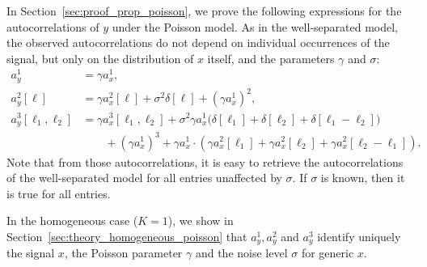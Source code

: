 \documentclass[12pt]{article}
\newcommand{\1}{\mathbf{1}}
\newcommand{\TODO}[1]{{\color{red}{[#1]}}}
\theoremstyle{plain}
\theoremstyle{definition}
\theoremstyle{remark}
\theoremstyle{plain}
\theoremstyle{remark}
\theoremstyle{plain}
\theoremstyle{plain}
\theoremstyle{plain}
\numberwithin{equation}{section}
\begin{document}
In Section~\ref{sec:proof_prop_poisson}, we prove the following expressions for the autocorrelations of $y$ under the Poisson model. As in the well-separated model, the observed autocorrelations do not depend on individual occurrences of the signal, but only on the distribution of $x$ itself, and the parameters $\gamma$ and $\sigma$: \TODO{Do these identities hold even without taking a limit? I guess so, but let's be sure.}
%
\begin{align}
	a_y^1  & =  \gamma a_{x}^1, \label{eq:mean_micrograph2} \\
	a_y^2[\ell] & = \gamma a_x^2[\ell] + \sigma^2 \delta[\ell] + (\gamma a_x^1)^2, \label{eq:ac2_micrograph2} \\
	a_y^3[\ell_1,\ell_2]  & =  \gamma a_x^3[\ell_1,\ell_2] + \sigma^2 \gamma a_x^1 \big(\delta[\ell_1]+\delta[\ell_2] +\delta[\ell_1-\ell_2] \big) \nonumber \\
						  & \qquad + (\gamma a_x^1)^3 + \gamma a_x^1 \cdot ( \gamma a_x^2[\ell_1] + \gamma a_x^2[\ell_2] + \gamma a_x^2[\ell_2-\ell_1]). \label{eq:ac3_micrograph2}
\end{align}
Note that from those autocorrelations, it is easy to retrieve the autocorrelations of the well-separated model for all entries unaffected by $\sigma$. If $\sigma$ is known, then it is true for all entries. 

In the homogeneous case ($K=1$), we show in Section~\ref{sec:theory_homogeneous_poisson} that $a_y^1,a_y^2$ and $a_y^3$ identify uniquely the signal $x$, the Poisson parameter $\gamma$ and the noise level $\sigma$ for generic $x$. 


%
\end{document}
